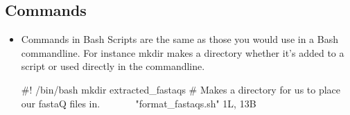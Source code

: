 \documentclass{article}
\begin{document}
\subsection*{Commands}
\begin{itemize}
	\item Commands in Bash Scripts are the same as those you would use in a Bash commandline. For instance mkdir makes a directory whether it's added to a script or used directly in the commandline.
	\begin{vim}
	#! /bin/bash
	mkdir extracted_fastaqs # Makes a directory for us to place our fastaQ files in.                                                                                                                                                                                                                               
	~                                                                                                                                                                                                                               
	~                                                                                                                                                                                                                               
	~                                                                                                                                                                                                                               
	~                                                                                                                                                                                                                                                                                                                                                                                                                                                             
	"format_fastaqs.sh" 1L, 13B	
	\end{vim}
\end{itemize}
\end{document}
